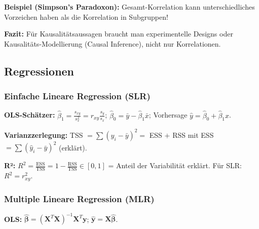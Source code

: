 \textbf{Beispiel (Simpson's Paradoxon):} Gesamt-Korrelation kann unterschiedliches Vorzeichen haben als die Korrelation in Subgruppen!

\textbf{Fazit:} Für Kausalitätsaussagen braucht man experimentelle Designs oder Kausalitäts-Modellierung (Causal Inference), nicht nur Korrelationen.
\newpage

\subsection{Regressionen}


\subsubsection{Einfache Lineare Regression (SLR)}


\textbf{OLS-Schätzer:} $\hat{\beta}_1 = \frac{s_{xy}}{s_x^2} = r_{xy}\frac{s_y}{s_x}$; $\hat{\beta}_0 = \bar{y} - \hat{\beta}_1 \bar{x}$; Vorhersage $\hat{y} = \hat{\beta}_0 + \hat{\beta}_1 x$.

\textbf{Varianzzerlegung:} TSS $= \sum(y_i - \bar{y})^2 = $ ESS $+ $ RSS mit ESS $= \sum(\hat{y}_i - \bar{y})^2$ (erklärt).

\textbf{R²:} $R^2 = \frac{\text{ESS}}{\text{TSS}} = 1 - \frac{\text{RSS}}{\text{TSS}} \in [0,1]$ = Anteil der Variabilität erklärt. Für SLR: $R^2 = r_{xy}^2$.

\subsubsection{Multiple Lineare Regression (MLR)}


\textbf{OLS:} $\hat{\boldsymbol{\beta}} = (\mathbf{X}^T\mathbf{X})^{-1}\mathbf{X}^T\mathbf{y}$; $\hat{\mathbf{y}} = \mathbf{X}\hat{\boldsymbol{\beta}}$.

